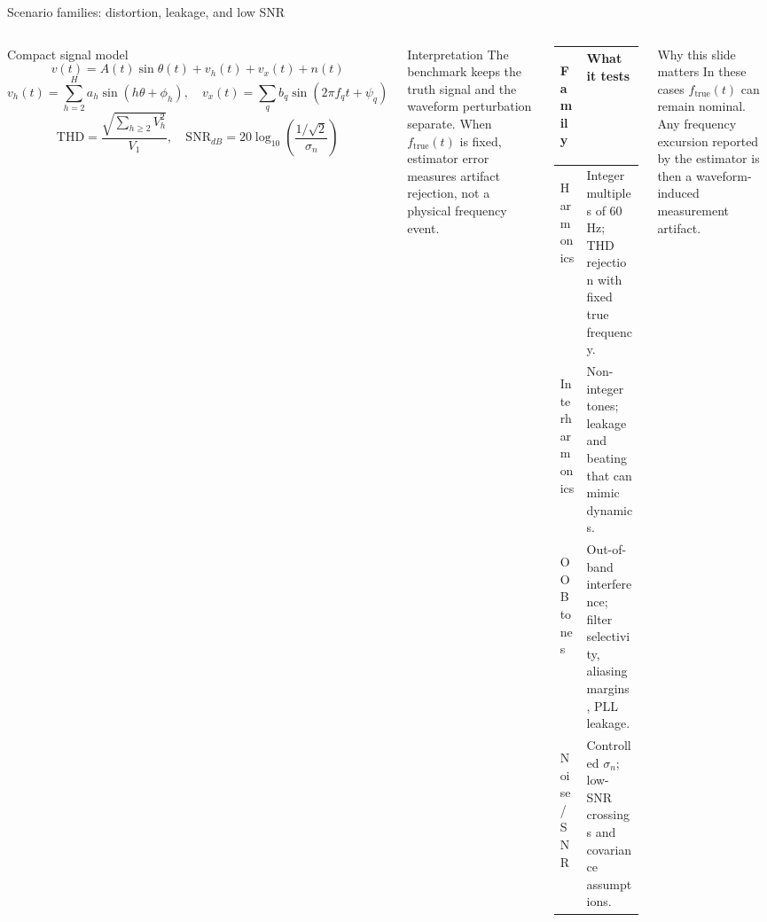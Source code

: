 \documentclass[aspectratio=169,10pt]{beamer}
\begin{document}
\begin{frame}[label=scenariofamilies]{Scenario families: distortion, leakage, and low SNR}
\vspace{-0.18em}
\begin{columns}[T,onlytextwidth]
\begin{block}{Compact signal model}
\scriptsize
\vspace{-0.5em}
\[
v(t)=A(t)\sin\theta(t)+v_h(t)+v_x(t)+n(t)
\]
\[
v_h(t)=\sum_{h=2}^{H}a_h\sin(h\theta+\phi_h),\quad
v_x(t)=\sum_q b_q\sin(2\pi f_qt+\psi_q)
\]
\[
\mathrm{THD}=\frac{\sqrt{\sum_{h\ge2}V_h^2}}{V_1},\quad
\mathrm{SNR}_{dB}=20\log_{10}\!\left(\frac{1/\sqrt{2}}{\sigma_n}\right)
\]
\end{block}
\vspace{0.15em}
\begin{block}{Interpretation}
\scriptsize
The benchmark keeps the truth signal and the waveform perturbation separate. When $f_{\mathrm{true}}(t)$ is fixed, estimator error measures artifact rejection, not a physical frequency event.
\end{block}
\scriptsize
\renewcommand{\arraystretch}{1.10}
\begin{tabular}{>{\bfseries\raggedright\arraybackslash}p{0.29\linewidth}>{\raggedright\arraybackslash}p{0.63\linewidth}}
\toprule
Family & What it tests \\
\midrule
Harmonics & Integer multiples of 60 Hz; THD rejection with fixed true frequency. \\
Interharmonics & Non-integer tones; leakage and beating that can mimic dynamics. \\
OOB tones & Out-of-band interference; filter selectivity, aliasing margins, PLL leakage. \\
Noise / SNR & Controlled $\sigma_n$; low-SNR crossings and covariance assumptions. \\
\bottomrule
\end{tabular}
\vspace{0.35em}
\begin{block}{Why this slide matters}
\scriptsize
In these cases $f_{\mathrm{true}}(t)$ can remain nominal. Any frequency excursion reported by the estimator is then a waveform-induced measurement artifact.
\end{block}
\end{columns}
\end{frame}
\end{document}
